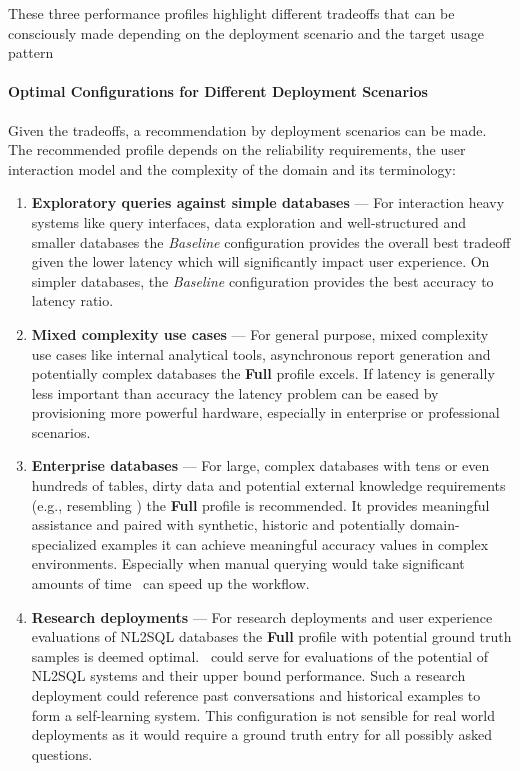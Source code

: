 These three performance profiles highlight different tradeoffs that can be
consciously made depending on the deployment scenario and the target usage
pattern

\paragraph{Optimal Configurations for Different Deployment Scenarios}\label{sec:discussion:deployment-scenarios}

Given the tradeoffs, a recommendation by deployment scenarios can be made.
The recommended profile depends on the reliability requirements, the user
interaction model and the complexity of the domain and its terminology:

\begin{enumerate}
    \item \textbf{Exploratory queries against simple databases} — For
        interaction heavy systems like query interfaces, data exploration and
        well-structured and smaller databases the \textit{Baseline}
        configuration provides the overall best tradeoff given the lower
        latency which will significantly impact user experience. On simpler
        databases, the \textit{Baseline} configuration provides the best
        accuracy to latency ratio.
    \item \textbf{Mixed complexity use cases} — For general purpose, mixed
        complexity use cases like internal analytical tools, asynchronous
        report generation and potentially complex databases the \textbf{Full}
        profile excels. If latency is generally less important than accuracy
        the latency problem can be eased by provisioning more powerful
        hardware, especially in enterprise or professional scenarios.
    \item \textbf{Enterprise databases} — For large, complex databases with
        tens or even hundreds of tables, dirty data and potential external
        knowledge requirements (e.g., resembling \Bird) the \textbf{Full}
        profile is recommended. It provides meaningful assistance and paired
        with synthetic, historic and potentially domain-specialized examples it
        can achieve meaningful accuracy values in complex environments.
        Especially when manual querying would take significant amounts of time
        \Natural~can speed up the workflow.
    \item \textbf{Research deployments} — For research deployments and user
        experience evaluations of NL2SQL databases the \textbf{Full} profile
        with potential ground truth samples is deemed optimal. \Natural~could
        serve for evaluations of the potential of NL2SQL systems and their
        upper bound performance. Such a research deployment could reference
        past conversations and historical examples to form a self-learning
        system. This configuration is not sensible for real world deployments
        as it would require a ground truth entry for all possibly asked
        questions. 
\end{enumerate}

